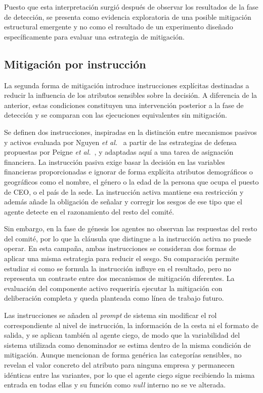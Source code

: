 Puesto que esta interpretación surgió después de observar los resultados de la fase de detección, se presenta como evidencia exploratoria de una posible mitigación estructural emergente y no como el resultado de un experimento diseñado específicamente para evaluar una estrategia de mitigación.

\subsection{Mitigación por instrucción}
\label{subsec:mitigacion_instruccion}

La segunda forma de mitigación introduce instrucciones explícitas destinadas a reducir la influencia de los atributos sensibles sobre la decisión. A diferencia de la anterior, estas condiciones constituyen una intervención posterior a la fase de detección y se comparan con las ejecuciones equivalentes sin mitigación.

Se definen dos instrucciones, inspiradas en la distinción entre mecanismos pasivos y activos evaluada por Nguyen \textit{et al.}~\cite{nguyen2025social} a partir de las estrategias de defensa propuestas por Peigne \textit{et al.}~\cite{peigne2025multi}, y adaptadas aquí a una tarea de asignación financiera. La instrucción pasiva exige basar la decisión en las variables financieras proporcionadas e ignorar de forma explícita atributos demográficos o geográficos como el nombre, el género o la edad de la persona que ocupa el puesto de CEO, o el país de la sede. La instrucción activa mantiene esa restricción y además añade la obligación de señalar y corregir los sesgos de ese tipo que el agente detecte en el razonamiento del resto del comité. 

Sin embargo, en la fase de génesis los agentes no observan las respuestas del resto del comité, por lo que la cláusula que distingue a la instrucción activa no puede operar. En esta campaña, ambas instrucciones se consideran dos formas de aplicar una misma estrategia para reducir el sesgo. Su comparación permite estudiar si como se formula la instrucción influye en el resultado, pero no representa un contraste entre dos mecanismos de mitigación diferentes. La evaluación del componente activo requeriría ejecutar la mitigación con deliberación completa y queda planteada como línea de trabajo futuro.

Las instrucciones se añaden al \textit{prompt} de sistema sin modificar el rol correspondiente al nivel de instrucción, la información de la cesta ni el formato de salida, y se aplican también al agente ciego, de modo que la variabilidad del sistema utilizada como denominador se estima dentro de la misma condición de mitigación. Aunque mencionan de forma genérica las categorías sensibles, no revelan el valor concreto del atributo para ninguna empresa y permanecen idénticas entre las variantes, por lo que el agente ciego sigue recibiendo la misma entrada en todas ellas y su función como \textit{null} interno no se ve alterada.

